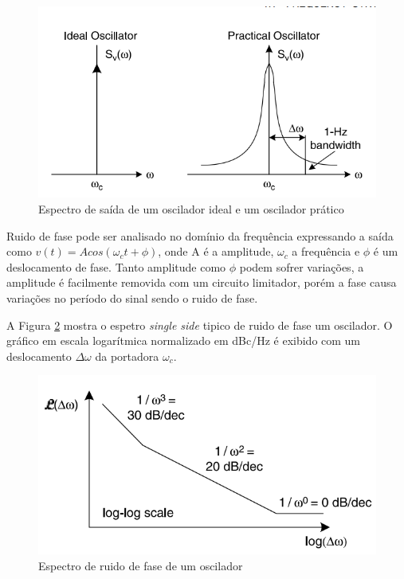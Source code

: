 \begin{figure}[htb]
	\caption{Espectro de saída de um oscilador ideal e um oscilador prático}
	\begin{center}
			\includegraphics[scale=0.8]{img/phase_noise_ideal_practical.png}
		\end{center}
	\label{fig:phase_noise_ideal_practical}
\end{figure}

Ruido de fase pode ser analisado no domínio da frequência expressando a saída como $v(t) = A cos(\omega_c t + \phi)$, onde A é a amplitude, $\omega_c$ a frequência e $\phi$ é um deslocamento de fase. Tanto amplitude como $\phi$ podem sofrer variações, a amplitude é facilmente removida com um circuito limitador, porém a fase causa variações no período do sinal sendo o ruido de fase.


A Figura \ref{fig:phase_noise_spectrum} mostra o espetro \textit{single side}  tipico de ruido de fase um oscilador. O gráfico em escala logarítmica normalizado em dBc/Hz é exibido com um deslocamento $\Delta \omega$ da portadora $\omega_c$. 

\begin{figure}[htb]
	\caption{Espectro de ruido de fase de um oscilador}
	\begin{center}
		\includegraphics[scale=0.8]{img/phase_noise_spectrum.png}
	\end{center}
	\label{fig:phase_noise_spectrum}
\end{figure}

